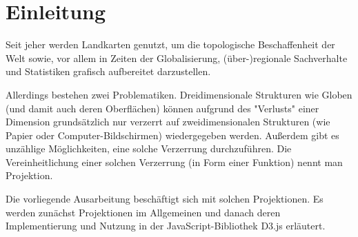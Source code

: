 
\chapter{Einleitung}
\label{ch:introduction}

Seit jeher werden Landkarten genutzt, um die topologische Beschaffenheit der Welt sowie, vor allem in Zeiten der Globalisierung, (über-)regionale Sachverhalte und Statistiken grafisch aufbereitet darzustellen.

Allerdings bestehen zwei Problematiken. Dreidimensionale Strukturen wie Globen (und damit auch deren Oberflächen) können aufgrund des "Verlusts" einer Dimension grundsätzlich nur verzerrt auf zweidimensionalen Strukturen (wie Papier oder Computer-Bildschirmen) wiedergegeben werden. Außerdem gibt es unzählige Möglichkeiten, eine solche Verzerrung durchzuführen. Die Vereinheitlichung einer solchen Verzerrung (in Form einer Funktion) nennt man Projektion.

Die vorliegende Ausarbeitung beschäftigt sich mit solchen Projektionen. Es werden zunächst Projektionen im Allgemeinen und danach deren Implementierung und Nutzung in der JavaScript-Bibliothek D3.js erläutert.

